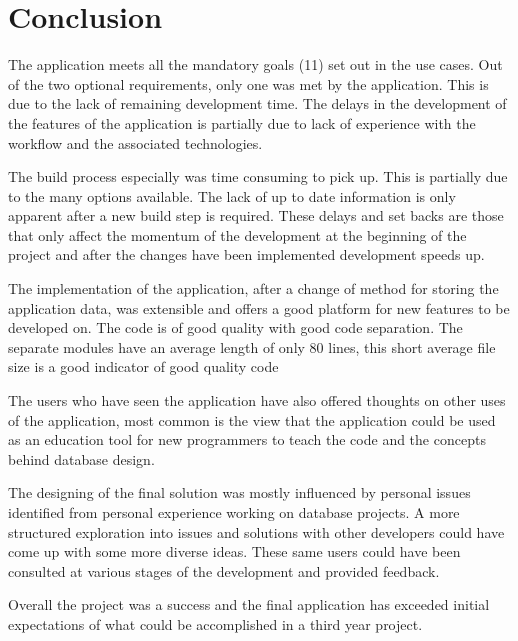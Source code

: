 \chapter{Conclusion}\label{conclusion}

The application meets all the mandatory goals (11) set out in the use cases.
Out of the two optional requirements, only one was met by the application.
This is due to the lack of remaining development time. The
delays in the development of the features of the application is
partially due to lack of experience with the workflow and the associated
technologies.

The build process especially was time consuming to pick up. This is
partially due to the many options available. The lack of up to date
information is only apparent after a new build step is required. These
delays and set backs are those that only affect the momentum of the
development at the beginning of the project and after the changes have
been implemented development speeds up.

The implementation of the application, after a change of method for
storing the application data, was extensible and offers a good platform
for new features to be developed on. The code is of good quality with
good code separation. The separate modules have an average length of only 80
lines, this short average file size is a good indicator of good quality code

The users who have seen the application have also offered thoughts on
other uses of the application, most common is the view that the
application could be used as an education tool for new programmers to
teach the code and the concepts behind database design.

The designing of the final solution was mostly influenced by personal
issues identified from personal experience working on database projects.
A more structured exploration into issues and solutions with other
developers could have come up with some more diverse ideas. These same
users could have been consulted at various stages of the development and
provided feedback.

Overall the project was a success and the final application has exceeded
initial expectations of what could be accomplished in a third year project.
